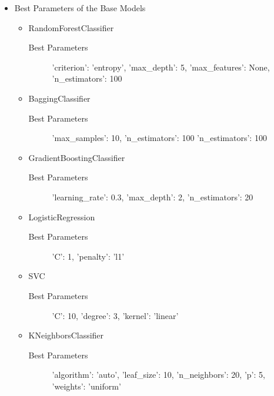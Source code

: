 \begin{itemize}
	\item Best Parameters of the Base Models
	
	\begin{itemize}
		\item RandomForestClassifier
		
		\begin{description}
			\item[Best Parameters] 'criterion': 'entropy', 'max_depth': 5, 'max_features': None, 'n_estimators': 100
		\end{description}
		
		\item BaggingClassifier
		
		\begin{description}
			\item[Best Parameters] 'max_samples': 10, 'n_estimators': 100 'n_estimators': 100
		\end{description}
		
		\item GradientBoostingClassifier
		
		\begin{description}
			\item[Best Parameters] 'learning_rate': 0.3, 'max_depth': 2, 'n_estimators': 20
		\end{description}
		
		\item LogisticRegression
		
		\begin{description}
			\item[Best Parameters] 'C': 1, 'penalty': 'l1'
		\end{description}
		
		\item SVC
		
		\begin{description}
			\item[Best Parameters] 'C': 10, 'degree': 3, 'kernel': 'linear'
		\end{description}
		
		\item KNeighborsClassifier
		
		\begin{description}
			\item[Best Parameters] 'algorithm': 'auto', 'leaf_size': 10, 'n_neighbors': 20, 'p': 5, 'weights': 'uniform'
		\end{description}
		

\end{itemize}
\end{itemize}
